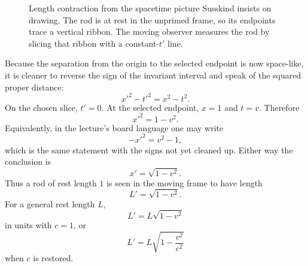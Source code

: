 \begin{figure}[h]
\centering
{}
\caption{Length contraction from the spacetime picture Susskind insists on drawing. The rod is at rest in the unprimed frame, so its endpoints trace a vertical ribbon. The moving observer measures the rod by slicing that ribbon with a constant-\(t'\) line.}
\end{figure}

Because the separation from the origin to the selected endpoint is now space-like, it is cleaner to reverse the sign of the invariant interval and speak of the squared proper distance:
\begin{equation}
x'^2-t'^2 = x^2-t^2.
\end{equation}
On the chosen slice, \(t'=0\). At the selected endpoint, \(x=1\) and \(t=v\). Therefore
\begin{equation}
x'^2 = 1-v^2.
\end{equation}
Equivalently, in the lecture's board language one may write
\begin{equation}
-x'^2 = v^2-1,
\end{equation}
which is the same statement with the signs not yet cleaned up. Either way the conclusion is
\begin{equation}
x'=\sqrt{1-v^2}.
\end{equation}
Thus a rod of rest length \(1\) is seen in the moving frame to have length
\begin{equation}
L'=\sqrt{1-v^2}.
\end{equation}
For a general rest length \(L\),
\begin{equation}
L' = L\sqrt{1-v^2}
\end{equation}
in units with \(c=1\), or
\begin{equation}
L' = L\sqrt{1-\frac{v^2}{c^2}}
\end{equation}
when \(c\) is restored.

